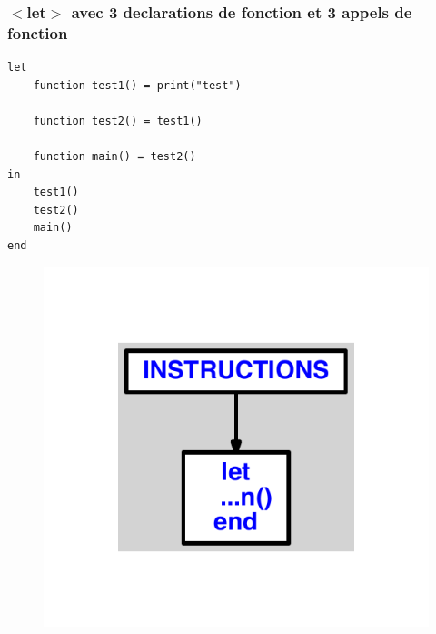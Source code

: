 \documentclass{article}
\begin{document}
\subsubsection{$ < $let$ > $ avec 3 declarations de fonction et 3 appels de fonction}
\begin{lstlisting}
let
	function test1() = print("test")

	function test2() = test1()

	function main() = test2()
in
	test1()
	test2()
	main()
end
\end{lstlisting}
\newpage
\begin{figure}[H]
\centering
\includegraphics[max width=\textwidth]{ast/ast_274.pdf}
\end{figure}
\newpage
\end{document}
